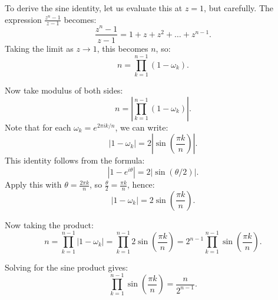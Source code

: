 To derive the sine identity, let us evaluate this at \( z = 1 \), but carefully. The expression \( \frac{z^n - 1}{z - 1} \) becomes:
\[
\frac{z^n - 1}{z - 1} = 1 + z + z^2 + \dots + z^{n-1}.
\]
Taking the limit as \( z \to 1 \), this becomes \( n \), so:
\[
n = \prod_{k=1}^{n-1} (1 - \omega_k).
\]

Now take modulus of both sides:
\[
n = \left| \prod_{k=1}^{n-1} (1 - \omega_k) \right|.
\]
Note that for each \( \omega_k = e^{2\pi i k/n} \), we can write:
\[
|1 - \omega_k| = 2 \left| \sin\left( \frac{\pi k}{n} \right) \right|.
\]
This identity follows from the formula:
\[
|1 - e^{i\theta}| = 2 |\sin(\theta/2)|.
\]
Apply this with \( \theta = \frac{2\pi k}{n} \), so \( \frac{\theta}{2} = \frac{\pi k}{n} \), hence:
\[
|1 - \omega_k| = 2 \sin\left( \frac{\pi k}{n} \right).
\]

Now taking the product:
\[
n = \prod_{k=1}^{n-1} |1 - \omega_k| = \prod_{k=1}^{n-1} 2 \sin\left( \frac{\pi k}{n} \right) = 2^{n-1} \prod_{k=1}^{n-1} \sin\left( \frac{\pi k}{n} \right).
\]

Solving for the sine product gives:
\[
\prod_{k=1}^{n-1} \sin\left( \frac{\pi k}{n} \right) = \frac{n}{2^{n-1}}.
\]
